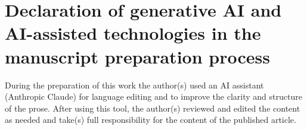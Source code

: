 %
%
%
%

\section*{Declaration of generative AI and AI-assisted technologies in the manuscript preparation process}

During the preparation of this work the author(s) used an AI assistant
(Anthropic Claude) for language editing and to improve the clarity and
structure of the prose. After using this tool, the author(s) reviewed
and edited the content as needed and take(s) full responsibility for the
content of the published article.

